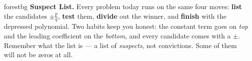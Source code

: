 \documentclass[10pt]{article}
\begin{document}
\namepartnerperiod

\vspace{0.08in}

\begin{headlinebox}{forestbg}
\small\textbf{Suspect List.} Every problem today runs on the same four moves: \textbf{list} the
candidates $\pm\frac{p}{q}$, \textbf{test} them, \textbf{divide} out the winner, and \textbf{finish}
with the depressed polynomial. Two habits keep you honest: the constant term goes on \emph{top} and
the leading coefficient on the \emph{bottom}, and every candidate comes with a $\pm$. Remember what
the list is --- a list of \emph{suspects}, not convictions. Some of them will not be zeros at all.
\end{headlinebox}

\vspace{0.06in}
\end{document}
